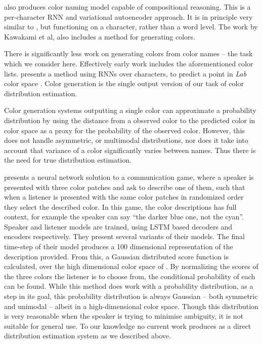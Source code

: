 \documentclass[11pt,letterpaper, twocolumn]{article}
\newcommand{\textcite}{\cite}
\begin{document}
\textcite{DBLP:journals/corr/KawakamiDRS16} also produces color naming model capable of compositional reasoning.
This is a per-character RNN and variational autoencoder approach.
It is in principle very similar to \textcite{2016arXiv160603821M}, but functioning on a character, rather than a word level.
The work by Kawakami et al, also includes a method for generating colors.

There is significantly less work on generating colors from color names -- the task which we consider here.
Effectively early work includes the aforementioned color lists.
\textcite{DBLP:journals/corr/KawakamiDRS16} presents a method using RNNs over characters, to predict a point in \emph{Lab} color space \cite{hunter1958photoelectric}.
Color generation is the single output version of our task of color distribution estimation.

Color generation systems outputting a single color can approximate a probability distribution by using the distance from a observed color to the predicted color in color space as a proxy for the probability of the observed color. However, this does not handle asymmetric, or multimodal distributions, nor does it take into account that variance of a color significantly varies between names.
Thus there is the need for true distribution estimation.

\textcite{DBLP:journals/corr/MonroeHGP17} presents a neural network solution to a communication game, where a speaker is presented with three color patches and ask to describe one of them, 
such that when a listener is presented with the same color patches in randomized order they select the described color.
In this game, the color descriptions has full context, for example the speaker can say ``the darker blue one, not the cyan''.
Speaker and listener models are trained, using LSTM based decoders and encoders respectively.
They present several variants of their models.
The final time-step of their model produces a 100 dimensional representation of the description provided.
From this, a Gaussian distributed score function is calculated, over the high dimensional color space of \textcite{2016arXiv160603821M}.
By normalizing the scores of the three colors the listener is to choose from, the conditional probability of each can be found.
While this method does work with a probability distribution, as a step in its goal,
this probability distribution is always Gaussian -- both symmetric and unimodal -- albeit in a high-dimensional color space.
Though this distribution is very reasonable when the speaker is trying to minimise ambiguity, it is not suitable for general use.
To our knowledge no current work produces as a direct distribution estimation system as we described above.
\end{document}
